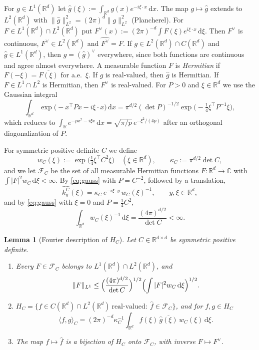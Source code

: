 \documentclass[11pt]{amsart}
\numberwithin{equation}{section}
\newtheorem{lemma}[theorem]{Lemma}
\theoremstyle{definition}
\theoremstyle{remark}
\newcommand{\R}{\mathbb{R}}
\newcommand{\dd}{\,\mathrm{d}}
\newcommand{\FC}[1]{\mathcal{F}_{#1}}
\newcommand{\ip}[2]{\langle #1,#2\rangle}
\newcommand{\hatf}[1]{\widehat{#1}}
\newcommand{\tp}{\top}
\begin{document}
For $g\in L^1(\R^d)$ let $\hatf g(\xi):=\int_{\R^d}g(x)e^{-i\xi\cdot x}\dd x$. The map $g\mapsto\hatf g$ extends
to $L^2(\R^d)$ with $\|\hatf g\|_{L^2}^2=(2\pi)^d\|g\|_{L^2}^2$ (Plancherel). For $F\in L^1(\R^d)\cap L^2(\R^d)$ put
$F^\vee(x):=(2\pi)^{-d}\int F(\xi)e^{i\xi\cdot x}\dd\xi$. Then $F^\vee$ is continuous, $F^\vee\in L^2(\R^d)$ and
$\hatf{F^\vee}=F$. If $g\in L^2(\R^d)\cap C(\R^d)$ and $\hatf g\in L^1(\R^d)$, then $g=(\hatf g)^\vee$ everywhere,
since both functions are continuous and agree almost everywhere. A measurable function $F$ is \emph{Hermitian} if
$F(-\xi)=\overline{F(\xi)}$ for a.e.\ $\xi$. If $g$ is real-valued, then $\hatf g$ is Hermitian. If
$F\in L^1\cap L^2$ is Hermitian, then $F^\vee$ is real-valued. For $P>0$ and $\xi\in\R^d$ we use the Gaussian integral
\begin{equation}\label{eq:gauss}
\int_{\R^d}\exp\bigl(-x^\tp Px-i\xi\cdot x\bigr)\dd x=\pi^{d/2}(\det P)^{-1/2}\exp\bigl(-\tfrac14\xi^\tp P^{-1}\xi\bigr),
\end{equation}
which reduces to $\int_\R e^{-px^2-i\xi x}\dd x=\sqrt{\pi/p}\,e^{-\xi^2/(4p)}$ after an orthogonal diagonalization of $P$.

For symmetric positive definite $C$ we define
\begin{equation}\label{eq:wC}
w_C(\xi):=\exp\bigl(\tfrac14\xi^\tp C^2\xi\bigr)\quad(\xi\in\R^d),\qquad \kappa_C:=\pi^{d/2}\det C ,
\end{equation}
and we let $\FC{C}$ be the set of all measurable Hermitian functions $F\colon\R^d\to\mathbb C$ with
$\int|F|^2w_C\dd\xi<\infty$. By \eqref{eq:gauss} with $P=C^{-2}$, followed by a translation,
\begin{equation}\label{eq:kernelFT}
\hatf{k^C_y}(\xi)=\kappa_C\,e^{-i\xi\cdot y}\,w_C(\xi)^{-1},\qquad y,\xi\in\R^d ,
\end{equation}
and by \eqref{eq:gauss} with $\xi=0$ and $P=\frac14C^2$,
\begin{equation}\label{eq:intw}
\int_{\R^d}w_C(\xi)^{-1}\dd\xi=\frac{(4\pi)^{d/2}}{\det C}<\infty .
\end{equation}

\begin{lemma}[Fourier description of $H_C$]\label{lem:fourier}
Let $C\in\R^{d\times d}$ be symmetric positive definite.
\begin{enumerate}
\item[(a)] Every $F\in\FC{C}$ belongs to $L^1(\R^d)\cap L^2(\R^d)$, and
\[
\|F\|_{L^1}\le\Bigl(\frac{(4\pi)^{d/2}}{\det C}\Bigr)^{1/2}\Bigl(\int|F|^2w_C\dd\xi\Bigr)^{1/2}.
\]
\item[(b)] $H_C=\{f\in C(\R^d)\cap L^2(\R^d)\ \text{real-valued}:\ \hatf f\in\FC{C}\}$, and for $f,g\in H_C$
\begin{equation}\label{eq:normC}
\ip fg_C=(2\pi)^{-d}\kappa_C^{-1}\int_{\R^d}\hatf f(\xi)\,\overline{\hatf g(\xi)}\,w_C(\xi)\dd\xi .
\end{equation}
\item[(c)] The map $f\mapsto\hatf f$ is a bijection of $H_C$ onto $\FC{C}$, with inverse $F\mapsto F^\vee$.
\end{enumerate}
\end{lemma}
\end{document}
